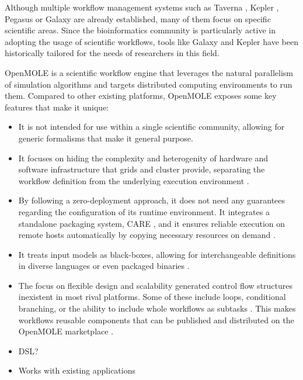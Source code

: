 Although multiple workflow management systems such as Taverna \cite{Taverna}, Kepler \cite{Kepler}, Pegasus \cite{Pegasus} or Galaxy \cite{Galaxy} are already established, many of them focus on specific scientific areas. Since the bioinformatics community is particularly active in adopting the usage of scientific workflows, tools like Galaxy and Kepler have been historically tailored for the needs of researchers in this field.

OpenMOLE \cite{Reuillon2013} is a scientific workflow engine that leverages the natural parallelism of simulation algorithms and targets distributed computing environments to run them. Compared to other existing platforms, OpenMOLE exposes some key features that make it unique:

\begin{itemize}
	\item It is not intended for use within a single scientific community, allowing for generic formalisms that make it general purpose.
	\item It focuses on hiding the complexity and heterogenity of hardware and software infrastructure that grids and cluster provide, separating the workflow definition from the underlying execution environment \cite{Reuillon2010}.
	\item By following a zero-deployment approach, it does not need any guarantees regarding the configuration of its runtime environment. It integrates a standalone packaging system, CARE \cite{Janin2014}, and it ensures reliable execution on remote hosts automatically by copying necessary resources on demand \cite{Reuillon2015}.
	\item It treats input models as black-boxes, allowing for interchangeable definitions in diverse languages or even packaged binaries \cite{Reuillon2013}.
	\item The focus on flexible design and scalability generated control flow structures inexistent in most rival platforms. Some of these include loops, conditional branching, or the ability to include whole workflows as subtasks \cite{Reuillon2013}. This makes workflows reusable components that can be published and distributed on the OpenMOLE marketplace \cite{OpenMOLEMarketplace}.
	\item DSL? 
	\item Works with existing applications 
\end{itemize}


